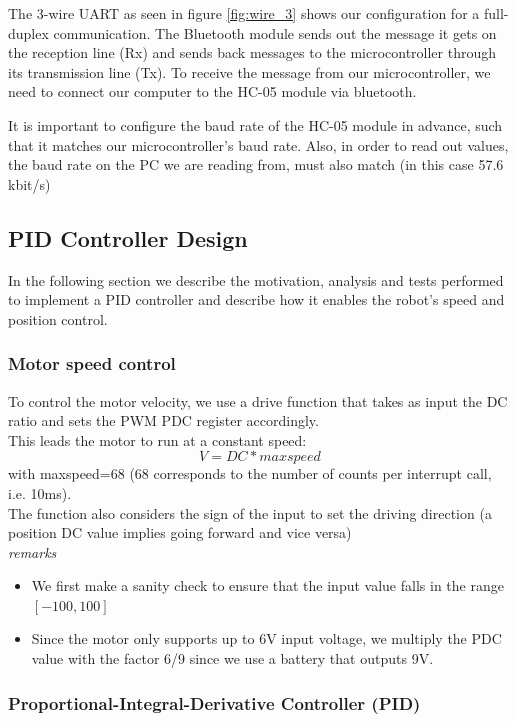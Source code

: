 The 3-wire UART as seen in figure \ref{fig:wire_3} shows our configuration for a full-duplex communication. The Bluetooth module sends out the message it gets on the reception line (Rx) and sends back messages to the microcontroller through its transmission line (Tx). To receive the message from our microcontroller, we need to connect our computer to the HC-05 module via bluetooth.

It is important to configure the baud rate of the HC-05 module in advance, such that it matches our microcontroller's baud rate. Also, in order to read out values, the baud rate on the PC we are reading from, must also match (in this case 57.6 kbit/s)

\newpage
\subsection{PID Controller Design}

In the following section we describe the motivation, analysis and tests performed to implement a PID controller and describe how it enables the robot's speed and position control.

\subsubsection{Motor speed control}
To control the motor velocity, we use a drive function that takes as input the DC ratio and sets the PWM PDC register accordingly. \\
\noindent
This leads the motor to run at a constant speed: $$V=DC*maxspeed$$ with maxspeed=68 (68 corresponds to the number of counts per interrupt call, i.e. 10ms). \\
\vskip 0.2in
\noindent
The function also considers the sign of the input to set the driving direction (a position DC value implies going forward and vice versa)\\
\vskip 0.2in
\noindent
\textit{remarks}
\begin{itemize}
    \item We first make a sanity check to ensure that the input value falls in the range $[-100, 100]$
    \item Since the motor only supports up to 6V input voltage, we multiply the PDC value with the factor 6/9 since we use a battery that outputs 9V.
\end{itemize}


\subsubsection{Proportional-Integral-Derivative Controller (PID)}

